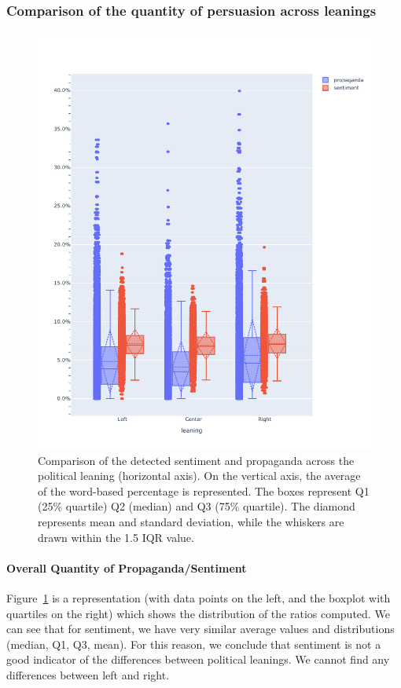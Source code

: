 \subsubsection{Comparison of the quantity of persuasion across leanings}

\begin{figure}[!htbp]
    \centering
    \includegraphics[width=\linewidth]{figures/prop_sent_tech_across_leaning_headlines_mod.pdf} %
    \caption{Comparison of the detected sentiment and propaganda across the political leaning (horizontal axis). On the vertical axis, the average of the word-based percentage is represented. The boxes represent Q1 (25\% quartile) Q2 (median) and Q3 (75\% quartile). The diamond represents mean and standard deviation, while the whiskers are drawn within the 1.5 IQR value.}
    \label{fig:prop_sent_across_leaning}
\end{figure}

\paragraph{Overall Quantity of Propaganda/Sentiment}
Figure~\ref{fig:prop_sent_across_leaning} is a representation (with data points on the left, and the boxplot with quartiles on the right) which shows the distribution of the ratios computed. We can see that for sentiment, we have very similar average values and distributions (median, Q1, Q3, mean).
For this reason, we conclude that sentiment is not a good indicator of the differences between political leanings. We cannot find any differences between left and right.

